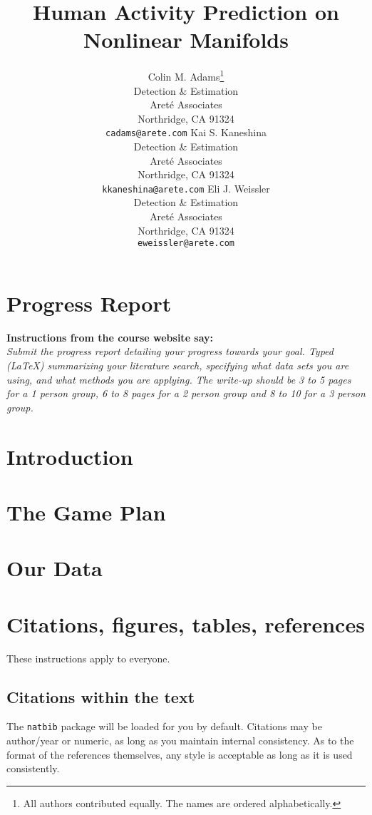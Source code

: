 \documentclass{article}
\title{Human Activity Prediction on Nonlinear Manifolds}
\author{
  Colin M. Adams\thanks{All authors contributed equally. The names are ordered alphabetically.} \\
   Detection \& Estimation\\
   Aret\'e Associates\\
   Northridge, CA 91324 \\
   \texttt{cadams@arete.com}
  \And
  Kai S. Kaneshina \\
   Detection \& Estimation\\
   Aret\'e Associates\\
   Northridge, CA 91324 \\
   \texttt{kkaneshina@arete.com} 
  \And
  Eli J. Weissler \\
   Detection \& Estimation\\
   Aret\'e Associates\\
   Northridge, CA 91324 \\
   \texttt{eweissler@arete.com}
}
\begin{document}

\maketitle

\begin{abstract}
  
\end{abstract}

\section{Progress Report}
\textbf{Instructions from the course website say:}\\
{\itshape Submit the progress report detailing your progress towards your goal. Typed (LaTeX) summarizing your literature search, specifying what data sets you are using, and what methods you are applying. The write-up should be 3 to 5 pages for a 1 person group, 6 to 8 pages for a 2 person group and 8 to 10 for a 3 person group. }


\section{Introduction}
  

\section{The Game Plan}
\label{sec:game_plan}
  

\section{Our Data}
\label{sec:data}
  


\section{Citations, figures, tables, references}
\label{others}

These instructions apply to everyone.

\subsection{Citations within the text}

The \verb+natbib+ package will be loaded for you by default.
Citations may be author/year or numeric, as long as you maintain
internal consistency.  As to the format of the references themselves,
any style is acceptable as long as it is used consistently.
\end{document}
